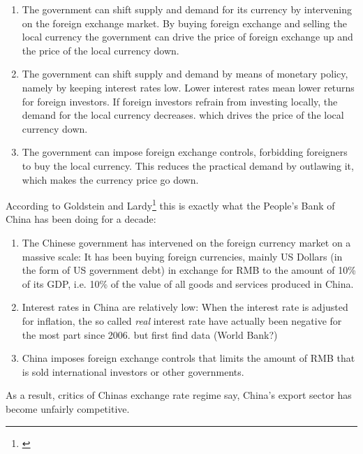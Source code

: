 \begin{enumerate}
\item{The government can shift supply and demand for its currency by 
	intervening on the foreign exchange market. By buying foreign 
exchange and selling the local currency the government can drive the 
price of foreign exchange up and the price of the local currency down.}
\item{The government can shift supply and demand by means of monetary 
	policy, namely by keeping interest rates low. Lower interest rates 
mean lower returns for foreign investors. If foreign investors refrain 
from investing locally, the demand for the local currency decreases.  
which drives the price of the local currency down.}
\item{The government can impose foreign exchange controls, forbidding 
	foreigners to buy the local currency. This reduces the practical 
demand by outlawing it, which makes the currency price go down.}
\end{enumerate}

According to Goldstein and Lardy\footnote{\cite[pp.  
40]{GoldsteinLardy2008}}  this is exactly what the People's Bank of 
China has been doing for a decade:

\begin{enumerate}
\item{The Chinese government has intervened on the foreign currency 
		market on a massive scale: It has been buying foreign 
		currencies, mainly US Dollars (in the form of US government 
		debt) in exchange for RMB to the amount of 10\% of its GDP, i.e. 
		10\% of the value of all goods and services produced in China.} 
\item{Interest rates in China are relatively low: When the interest rate 
	is adjusted for inflation, the so called \emph{real} interest rate 
have actually been negative for the most part since 2006.} %
but first find data (World Bank?)
\item{China imposes foreign exchange controls that limits the amount of RMB that is sold international investors or other governments.}
\end{enumerate}

As a result, critics of Chinas exchange rate regime say, China's export 
sector has become unfairly competitive. 

